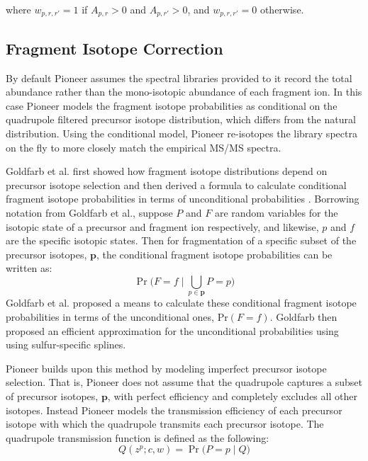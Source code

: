 \documentclass[pdflatex,sn-nature]{sn-jnl}
\begin{document}
where $w_{p,r,r'} = 1$ if $A_{p,r} > 0$ and $A_{p,r'} > 0$, and $w_{p,r,r'} = 0$ otherwise.

\subsection{Fragment Isotope Correction}\label{subsec:fragment-isotope-correction}

By default Pioneer assumes the spectral libraries provided to it record the total abundance rather than the mono-isotopic abundance of each fragment ion. In this case Pioneer models the fragment isotope probabilities as conditional on the quadrupole filtered precursor isotope distribution, which differs from the natural distribution.  Using the conditional model, Pioneer re-isotopes the library spectra on the fly to more closely match the empirical MS/MS spectra. 

 Goldfarb et al. first showed how fragment isotope distributions depend on precursor isotope selection and then derived a formula to calculate conditional fragment isotope probabilities in terms of unconditional probabilities \cite{Goldfarb2018-ai}. Borrowing notation from Goldfarb et al., suppose $P$ and $F$ are random variables for the isotopic state of a precursor and fragment ion respectively, and likewise, $p$ and $f$ are the specific isotopic states. Then for fragmentation of a specific subset of the precursor isotopes, $\mathbf{p}$, the conditional fragment isotope probabilities can be written as:  
\begin{equation}
    \Pr\bigl( F=f \mid \bigcup\limits_{p\in \boldsymbol{p}} P = p \bigr)
\end{equation}
Goldfarb et al. proposed a means to calculate these conditional fragment isotope probabilities in terms of the unconditional ones, $\text{Pr}(F = f)$. Goldfarb then proposed an efficient approximation for the unconditional probabilities using using sulfur-specific splines. 

Pioneer builds upon this method by modeling imperfect precursor isotope selection. That is, Pioneer does not assume that the quadrupole captures a subset of precursor isotopes, $\mathbf{p}$, with perfect efficiency and completely excludes all other isotopes. Instead Pioneer models the transmission efficiency of each precursor isotope with which the quadrupole transmits each precursor isotope. The quadrupole transmission function is defined as the following:
\begin{equation}
    Q(z^{p}; c, w) = \Pr\bigl( P=p \mid Q)
\end{equation}
\end{document}
